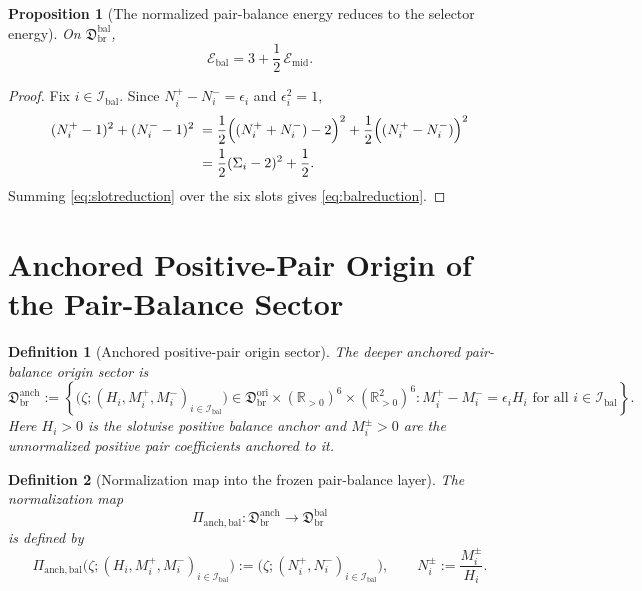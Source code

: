\documentclass[11pt]{article}
\newcommand{\OriginSector}{\mathfrak D_{\mathrm{br}}^{\mathrm{ori}}}
\newcommand{\SelEnergy}{\mathscr E_{\mathrm{mid}}}
\newcommand{\MidBalanceSector}{\mathfrak D_{\mathrm{br}}^{\mathrm{bal}}}
\newcommand{\BalEnergy}{\mathscr E_{\mathrm{bal}}}
\newcommand{\BalOriginSector}{\mathfrak D_{\mathrm{br}}^{\mathrm{anch}}}
\newcommand{\BalOriginMap}{\Pi_{\mathrm{anch,bal}}}
\newcommand{\BalIndex}{\mathcal I_{\mathrm{bal}}}
\newtheorem{definition}{Definition}
\newtheorem{proposition}{Proposition}
\begin{document}
\begin{proposition}[The normalized pair-balance energy reduces to the selector energy]
\label{prop:balreduction}
On \(\MidBalanceSector\),
\begin{equation}
\BalEnergy
=
3+\frac12\,\SelEnergy.
\label{eq:balreduction}
\end{equation}
\end{proposition}

\begin{proof}
Fix \(i\in\BalIndex\). Since \(N_i^+-N_i^-=\epsilon_i\) and \(\epsilon_i^2=1\),
\begin{align}
(N_i^+-1)^2+(N_i^--1)^2
\;&=
\frac12\Bigl((N_i^++N_i^-)-2\Bigr)^2
+
\frac12\Bigl((N_i^+-N_i^-)\Bigr)^2
\nonumber\\
\;&=
\frac12(\Sigma_i-2)^2+\frac12.
\label{eq:slotreduction}
\end{align}
Summing \eqref{eq:slotreduction} over the six slots gives \eqref{eq:balreduction}.
\end{proof}

\section{Anchored Positive-Pair Origin of the Pair-Balance Sector}

\begin{definition}[Anchored positive-pair origin sector]
\label{def:anchsector}
The deeper anchored pair-balance origin sector is
\begin{equation}
\BalOriginSector
:=
\left\{
\bigl(\zeta;(H_i,M_i^+,M_i^-)_{i\in\BalIndex}\bigr)
\in
\OriginSector\times(\mathbb R_{>0})^{6}\times(\mathbb R_{>0}^{2})^{6}
:
M_i^+-M_i^-=\epsilon_i H_i
\text{ for all }i\in\BalIndex
\right\}.
\label{eq:anchsector}
\end{equation}
Here \(H_i>0\) is the slotwise positive balance anchor and \(M_i^\pm>0\) are the unnormalized positive pair coefficients anchored to it.
\end{definition}

\begin{definition}[Normalization map into the frozen pair-balance layer]
\label{def:anchmap}
The normalization map
\begin{equation}
\BalOriginMap:\BalOriginSector\longrightarrow\MidBalanceSector
\label{eq:anchmap}
\end{equation}
is defined by
\begin{equation}
\BalOriginMap\bigl(\zeta;(H_i,M_i^+,M_i^-)_{i\in\BalIndex}\bigr)
:=
\bigl(\zeta;(N_i^+,N_i^-)_{i\in\BalIndex}\bigr),
\qquad
N_i^\pm:=\frac{M_i^\pm}{H_i}.
\label{eq:anchmapexplicit}
\end{equation}
\end{definition}
\end{document}
